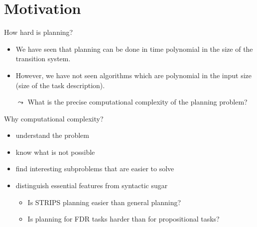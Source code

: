 \documentclass{gkibeamer}
\begin{document}
\subtitle{13.~Computational complexity of classical planning}
\date{July 20th, 2010}
\maketitles


\section{Motivation}

\begin{frame}{How hard is planning?}
  \begin{itemize}
  \item We have seen that planning can be done in time
    \alert{polynomial} in the size of the \alert{transition system}.
  \item However, we have not seen algorithms which are polynomial
    in the \alert{input size} (size of the task description).
  \item[$\leadsto$] What is the precise \alert{computational complexity} of
    the \alert{planning problem}?
  \end{itemize}
\end{frame}

\begin{frame}{Why computational complexity?}
  \begin{itemize}
  \item \alert{understand} the problem
  \item know what is \alert{not} possible
  \item find interesting \alert{subproblems} that are easier to solve
  \item distinguish \alert{essential features} from \alert{syntactic
    sugar}
    \begin{itemize}
    \item Is STRIPS planning easier than general planning?
    \item Is planning for FDR tasks harder than for propositional
      tasks?
    \end{itemize}
  \end{itemize}
\end{frame}
\end{document}
